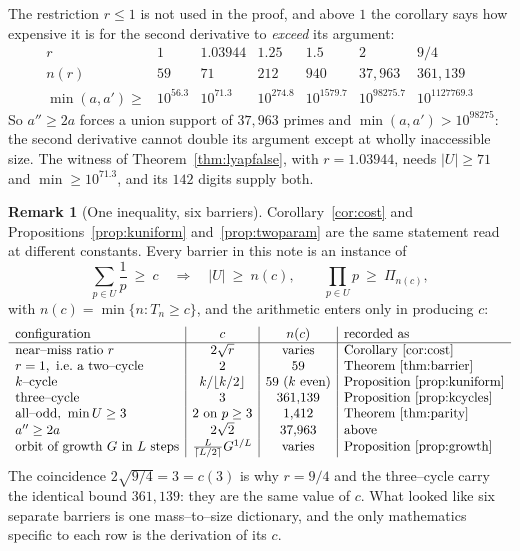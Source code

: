 \documentclass[11pt]{article}
\theoremstyle{definition}
\newtheorem{remark}[theorem]{Remark}
\begin{document}
The restriction $r\le1$ is not used in the proof, and above $1$ the corollary says how expensive it
is for the second derivative to \emph{exceed} its argument:
\[
\begin{array}{l|cccccc}
r & 1 & 1.03944 & 1.25 & 1.5 & 2 & 9/4\\\hline
n(r) & 59 & 71 & 212 & 940 & 37{,}963 & 361{,}139\\
\min(a,a')\ge & 10^{56.3} & 10^{71.3} & 10^{274.8} & 10^{1579.7} & 10^{98275.7} & 10^{1127769.3}
\end{array}
\]
So $a''\ge2a$ forces a union support of $37{,}963$ primes and $\min(a,a')>10^{98275}$: the second
derivative cannot double its argument except at wholly inaccessible size. The witness of
Theorem~\ref{thm:lyapfalse}, with $r=1.03944$, needs $|U|\ge71$ and $\min\ge10^{71.3}$, and its $142$
digits supply both.

\begin{remark}[One inequality, six barriers]\label{rem:dictionary}
Corollary~\ref{cor:cost} and Propositions~\ref{prop:kuniform} and~\ref{prop:twoparam} are the same
statement read at different constants. Every barrier in this note is an instance of
\[ \sum_{p\in U}\frac1p\ \ge\ c \quad\Longrightarrow\quad |U|\ \ge\ n(c),\qquad \prod_{p\in U}p\ \ge\
\Pi_{n(c)}, \]
with $n(c)=\min\{n:T_n\ge c\}$, and the arithmetic enters only in producing $c$:
\[
\begin{array}{l|c|c|l}
\text{configuration} & c & n(c) & \text{recorded as}\\\hline
\text{near--miss ratio }r & 2\sqrt r & \text{varies} & \text{Corollary~\ref{cor:cost}}\\
r=1,\ \text{i.e.\ a two--cycle} & 2 & 59 & \text{Theorem~\ref{thm:barrier}}\\
k\text{--cycle} & k/\lfloor k/2\rfloor & 59\ (k\text{ even}) & \text{Proposition~\ref{prop:kuniform}}\\
\text{three--cycle} & 3 & 361{,}139 & \text{Proposition~\ref{prop:kcycles}}\\
\text{all--odd, }\min U\ge3 & 2\ \text{on }p\ge3 & 1{,}412 & \text{Theorem~\ref{thm:parity}}\\
a''\ge2a & 2\sqrt2 & 37{,}963 & \text{above}\\
\text{orbit of growth }G\text{ in }L\text{ steps} & \tfrac{L}{\lceil L/2\rceil}G^{1/L} &
 \text{varies} & \text{Proposition~\ref{prop:growth}}
\end{array}
\]
The coincidence $2\sqrt{9/4}=3=c(3)$ is why $r=9/4$ and the three--cycle carry the identical bound
$361{,}139$: they are the same value of $c$. What looked like six separate barriers is one
mass--to--size dictionary, and the only mathematics specific to each row is the derivation of its
$c$.
\end{remark}
\end{document}
